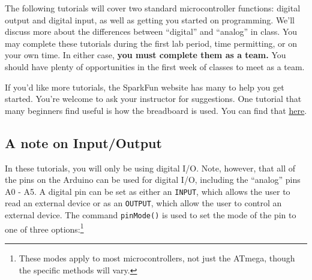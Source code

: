 \documentclass[11pt]{article} %
\begin{document}
The following tutorials will cover two standard microcontroller functions: digital output and digital input, as well as getting you started on programming. We’ll discuss more about the differences between “digital” and “analog” in class. You may complete these tutorials during the first lab period, time permitting, or on your own time. In either case, {\bf you must complete them as a team.} You should have plenty of opportunities in the first week of classes to meet as a team.

If you’d like more tutorials, the SparkFun website has many to help you get started. You’re welcome to ask your instructor for suggestions. One tutorial that many beginners find useful is how the breadboard is used. You can find that \href{https://learn.sparkfun.com/tutorials/how-to-use-a-breadboard}{\underline{here}}.

\subsection*{A note on Input/Output}

In these tutorials, you will only be using digital I/O. Note, however, that all of the pins on the Arduino can be used for digital I/O, including the “analog” pins A0 - A5. A digital pin can be set as either an \verb|INPUT|, which allows the user to read an external device or as an \verb|OUTPUT|, which allow the user to control an external device. The command \verb|pinMode()| is used to set the mode of the pin to one of three options:\footnote{These modes apply to most microcontrollers, not just the ATmega, though the specific methods will vary.}
\end{document}
